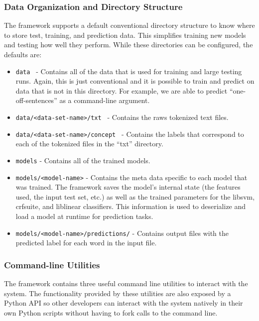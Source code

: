 \documentclass[preprint]{style}
\begin{document}
\subsubsection{Data Organization and Directory Structure}


The framework supports a default conventional directory structure to know where to store test, training, and prediction data. This simplifies training new models and testing how well they perform. While these directories can be configured, the defaults are:

\begin{itemize}

\item {\tt data } -  Contains all of the data that is used for training and large testing runs. Again, this is just conventional and it is possible to train and predict on data that is not in this directory. For example, we are able to predict ``one-off-sentences'' as a command-line argument.

\item {\tt data/<data-set-name>/txt } - Contains the raws tokenized text files.

\item {\tt data/<data-set-name>/concept } - Contains the labels that correspond to each of the tokenized files in the ``txt'' directory.

\item {\tt models} - Contains all of the trained models.

\item {\tt models/<model-name>} - Contains the meta data specific to each model that was trained. The framework saves the model's internal state (the features used, the input test set, etc.) as well as the trained parameters for the libsvm, crfsuite, and liblinear classifiers. This information is used to deserialize and load a model at runtime for prediction tasks.

\item {\tt models/<model-name>/predictions/} - Contains output files with the predicted label for each word in the input file.

\end{itemize}

\subsubsection{Command-line Utilities}


The framework contains three useful command line utilities to interact with the system. The functionality provided by these utilities are also exposed by a Python API so other developers can interact with the system natively in their own Python scripts without having to fork calls to the command line. 
\end{document}
